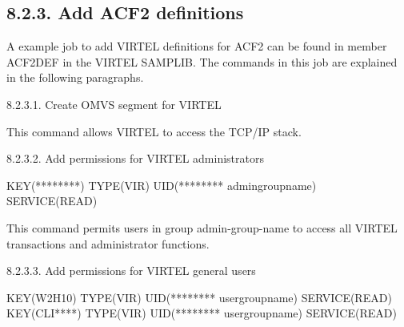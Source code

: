 \documentclass[letterpaper,10pt,english]{sphinxmanual}
\begin{document}
\subsection{8.2.3. Add ACF2 definitions}
\label{\detokenize{Installation_Guide:add-acf2-definitions}}
A example job to add VIRTEL definitions for ACF2 can be found in member ACF2DEF in the VIRTEL SAMPLIB. The commands in this job are explained in the following paragraphs.

8.2.3.1. Create OMVS segment for VIRTEL

\begin{sphinxVerbatim}[commandchars=\\\{\}]
  
    
\end{sphinxVerbatim}


This command allows VIRTEL to access the TCP/IP stack.

8.2.3.2. Add permissions for VIRTEL administrators

\begin{sphinxVerbatim}[commandchars=\\\{\}]
\PYGZdl{}KEY(********) TYPE(VIR) UID(******** admin\PYGZhy{}group\PYGZhy{}name) SERVICE(READ)
\end{sphinxVerbatim}


This command permits users in group admin-group-name to access all VIRTEL transactions and administrator functions.

8.2.3.3. Add permissions for VIRTEL general users

\begin{sphinxVerbatim}[commandchars=\\\{\}]
\PYGZdl{}KEY(W2H\PYGZhy{}10) TYPE(VIR) UID(******** user\PYGZhy{}group\PYGZhy{}name) SERVICE(READ)
\PYGZdl{}KEY(CLI\PYGZhy{}****) TYPE(VIR) UID(******** user\PYGZhy{}group\PYGZhy{}name) SERVICE(READ)
\end{sphinxVerbatim}

\end{document}
